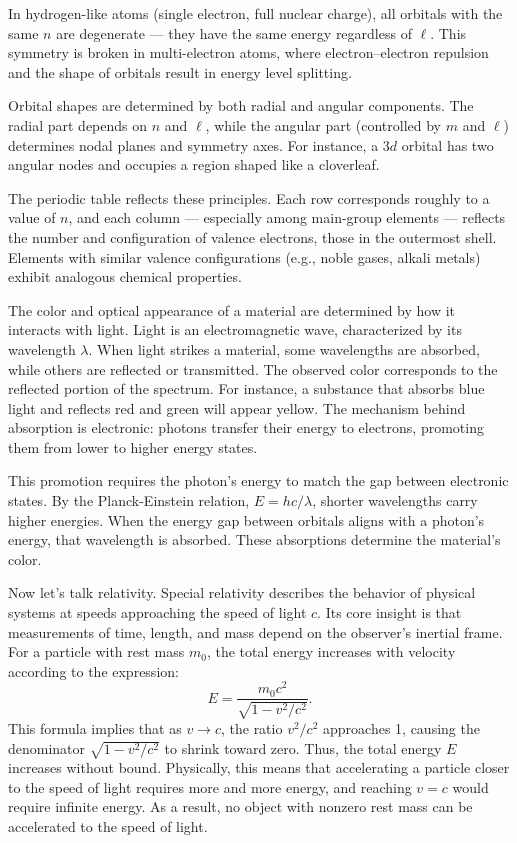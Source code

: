 \medskip

In hydrogen-like atoms (single electron, full nuclear charge), all orbitals with the same $n$ are degenerate — they have the same energy regardless of $\ell$. This symmetry is broken in multi-electron atoms, where electron–electron repulsion and the shape of orbitals result in energy level splitting.

Orbital shapes are determined by both radial and angular components. The radial part depends on $n$ and $\ell$, while the angular part (controlled by $m$ and $\ell$) determines nodal planes and symmetry axes. For instance, a $3d$ orbital has two angular nodes and occupies a region shaped like a cloverleaf.

\medskip

The periodic table reflects these principles. Each row corresponds roughly to a value of $n$, and each column — especially among main-group elements — reflects the number and configuration of valence electrons, those in the outermost shell. Elements with similar valence configurations (e.g., noble gases, alkali metals) exhibit analogous chemical properties.

\medskip

The color and optical appearance of a material are determined by how it interacts with light. Light is an electromagnetic wave, characterized by its wavelength \( \lambda \). When light strikes a material, some wavelengths are absorbed, while others are reflected or transmitted. The observed color corresponds to the reflected portion of the spectrum. For instance, a substance that absorbs blue light and reflects red and green will appear yellow. The mechanism behind absorption is electronic: photons transfer their energy to electrons, promoting them from lower to higher energy states.

This promotion requires the photon's energy to match the gap between electronic states. By the Planck-Einstein relation, $E = hc/\lambda$, shorter wavelengths carry higher energies. When the energy gap between orbitals aligns with a photon's energy, that wavelength is absorbed. These absorptions determine the material's color.

Now let's talk relativity. Special relativity describes the behavior of physical systems at speeds approaching the speed of light \( c \). Its core insight is that measurements of time, length, and mass depend on the observer’s inertial frame. For a particle with rest mass \( m_0 \), the total energy increases with velocity according to the expression:
\[
E = \frac{m_0 c^2}{\sqrt{1 - v^2/c^2}}.
\]
This formula implies that as \( v \to c \), the ratio \( v^2/c^2 \) approaches 1, causing the denominator \( \sqrt{1 - v^2/c^2} \) to shrink toward zero. Thus, the total energy \( E \) increases without bound. Physically, this means that accelerating a particle closer to the speed of light requires more and more energy, and reaching \( v = c \) would require infinite energy. As a result, no object with nonzero rest mass can be accelerated to the speed of light.

